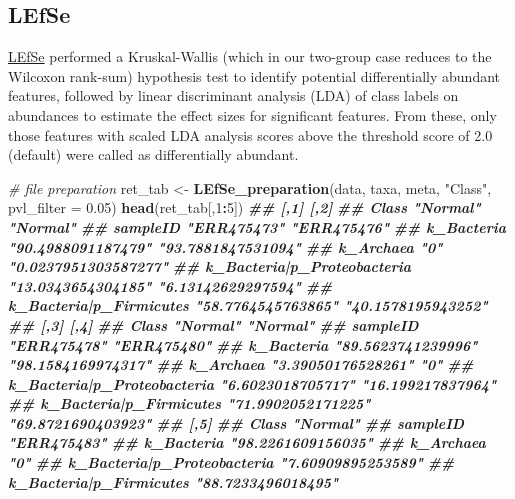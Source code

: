 \documentclass[
]{article}
\newenvironment{Shaded}{\begin{snugshade}}{\end{snugshade}}
\newcommand{\AttributeTok}[1]{\textcolor[rgb]{0.13,0.29,0.53}{#1}}
\newcommand{\CommentTok}[1]{\textcolor[rgb]{0.56,0.35,0.01}{\textit{#1}}}
\newcommand{\DecValTok}[1]{\textcolor[rgb]{0.00,0.00,0.81}{#1}}
\newcommand{\DocumentationTok}[1]{\textcolor[rgb]{0.56,0.35,0.01}{\textbf{\textit{#1}}}}
\newcommand{\FloatTok}[1]{\textcolor[rgb]{0.00,0.00,0.81}{#1}}
\newcommand{\FunctionTok}[1]{\textcolor[rgb]{0.13,0.29,0.53}{\textbf{#1}}}
\newcommand{\NormalTok}[1]{#1}
\newcommand{\OtherTok}[1]{\textcolor[rgb]{0.56,0.35,0.01}{#1}}
\newcommand{\SpecialCharTok}[1]{\textcolor[rgb]{0.81,0.36,0.00}{\textbf{#1}}}
\newcommand{\StringTok}[1]{\textcolor[rgb]{0.31,0.60,0.02}{#1}}
\begin{document}
\hypertarget{lefse}{%
\subsection{LEfSe}\label{lefse}}

\href{https://pubmed.ncbi.nlm.nih.gov/21702898/}{LEfSe} performed a
Kruskal-Wallis (which in our two-group case reduces to the Wilcoxon
rank-sum) hypothesis test to identify potential differentially abundant
features, followed by linear discriminant analysis (LDA) of class labels
on abundances to estimate the effect sizes for significant features.
From these, only those features with scaled LDA analysis scores above
the threshold score of 2.0 (default) were called as differentially
abundant.

\begin{Shaded}
\begin{Highlighting}[]
\CommentTok{\# file preparation}
\NormalTok{ret\_tab }\OtherTok{\textless{}{-}} \FunctionTok{LEfSe\_preparation}\NormalTok{(data, taxa, meta, }\StringTok{"Class"}\NormalTok{, }\AttributeTok{pvl\_filter =} \FloatTok{0.05}\NormalTok{)}
\FunctionTok{head}\NormalTok{(ret\_tab[,}\DecValTok{1}\SpecialCharTok{:}\DecValTok{5}\NormalTok{])}
\DocumentationTok{\#\#                             [,1]               [,2]                }
\DocumentationTok{\#\# Class                       "Normal"           "Normal"            }
\DocumentationTok{\#\# sampleID                    "ERR475473"        "ERR475476"         }
\DocumentationTok{\#\# k\_Bacteria                  "90.4988091187479" "93.7881847531094"  }
\DocumentationTok{\#\# k\_Archaea                   "0"                "0.0237951303587277"}
\DocumentationTok{\#\# k\_Bacteria|p\_Proteobacteria "13.0343654304185" "6.13142629297594"  }
\DocumentationTok{\#\# k\_Bacteria|p\_Firmicutes     "58.7764545763865" "40.1578195943252"  }
\DocumentationTok{\#\#                             [,3]               [,4]              }
\DocumentationTok{\#\# Class                       "Normal"           "Normal"          }
\DocumentationTok{\#\# sampleID                    "ERR475478"        "ERR475480"       }
\DocumentationTok{\#\# k\_Bacteria                  "89.5623741239996" "98.1584169974317"}
\DocumentationTok{\#\# k\_Archaea                   "3.39050176528261" "0"               }
\DocumentationTok{\#\# k\_Bacteria|p\_Proteobacteria "6.6023018705717"  "16.199217837964" }
\DocumentationTok{\#\# k\_Bacteria|p\_Firmicutes     "71.9902052171225" "69.8721690403923"}
\DocumentationTok{\#\#                             [,5]              }
\DocumentationTok{\#\# Class                       "Normal"          }
\DocumentationTok{\#\# sampleID                    "ERR475483"       }
\DocumentationTok{\#\# k\_Bacteria                  "98.2261609156035"}
\DocumentationTok{\#\# k\_Archaea                   "0"               }
\DocumentationTok{\#\# k\_Bacteria|p\_Proteobacteria "7.60909895253589"}
\DocumentationTok{\#\# k\_Bacteria|p\_Firmicutes     "88.7233496018495"}


\end{Highlighting}
\end{Shaded}
\end{document}

